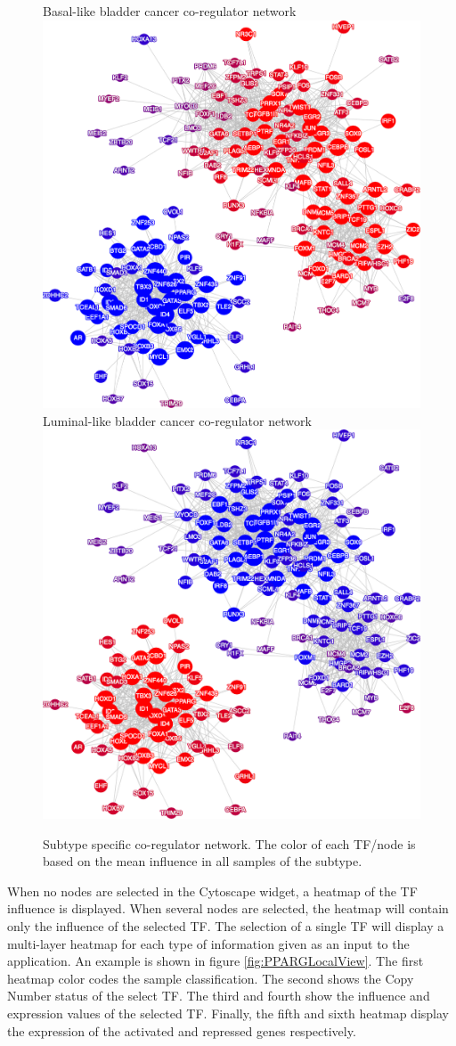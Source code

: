 \documentclass[12pt]{article}
\begin{document}
\newpage


\begin{figure}[hp!]
\centering
{\LARGE Basal-like bladder cancer co-regulator network}
\includegraphics[width=0.7\linewidth]{fig/basal1}
\\
{\LARGE Luminal-like bladder cancer co-regulator network}
\includegraphics[width=0.7\linewidth]{fig/luminal1}
\caption{Subtype specific co-regulator network. The color of each TF/node is based on the mean influence in all samples of the subtype.}
\label{fig:subtypeCoreg}
\end{figure}

\newpage

When no nodes are selected in the Cytoscape widget, a heatmap of the TF influence is displayed. When several nodes are selected, the heatmap will contain only the influence of the selected TF.
The selection of a single TF will display a multi-layer heatmap for each type of information given as an input to the application.
An example is shown in figure \ref{fig:PPARGLocalView}.
The first heatmap color codes the sample classification. The second shows the Copy Number status of the select TF. The third and fourth show the influence and expression values of the selected TF. Finally, the fifth and sixth heatmap display the expression of the activated and repressed genes respectively.
\end{document}
